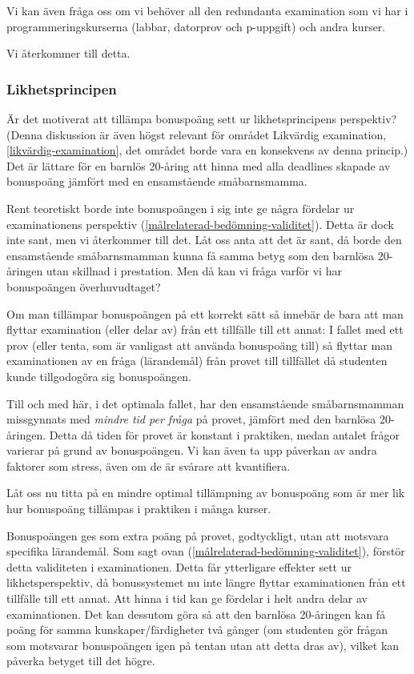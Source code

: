 Vi kan även fråga oss om vi behöver all den redundanta examination som
vi har i programmeringskurserna (labbar, datorprov och p-uppgift) och
andra kurser.

Vi återkommer till detta.

\subsubsection{Likhetsprincipen}\label{likhetsprincipen}

Är det motiverat att tillämpa bonuspoäng sett ur likhetsprincipens
perspektiv? (Denna diskussion är även högst relevant för området
Likvärdig examination, \cref{likvärdig-examination}, det området borde vara en 
konsekvens av denna princip.) Det är lättare för en barnlös 20-åring att hinna 
med alla deadlines skapade av bonuspoäng jämfört med en ensamstående
småbarnsmamma.

Rent teoretiskt borde inte bonuspoängen i sig inte ge några fördelar ur
examinationens perspektiv (\cref{målrelaterad-bedömning-validitet}). Detta är 
dock inte sant, men vi återkommer
till det. Låt oss anta att det är sant, då borde den ensamstående
småbarnsmamman kunna få samma betyg som den barnlösa 20-åringen utan
skillnad i prestation. Men då kan vi fråga varför vi har bonuspoängen
överhuvudtaget?

Om man tillämpar bonuspoängen på ett korrekt sätt så innebär de bara att
man flyttar examination (eller delar av) från ett tillfälle till ett
annat: I fallet med ett prov (eller tenta, som är vanligast att använda
bonuspoäng till) så flyttar man examinationen av en fråga (lärandemål)
från provet till tillfället då studenten kunde tillgodogöra sig
bonuspoängen.

Till och med här, i det optimala fallet, har den ensamstående
småbarnsmamman missgynnats med \emph{mindre tid per fråga} på provet,
jämfört med den barnlösa 20-åringen. Detta då tiden för provet är
konstant i praktiken, medan antalet frågor varierar på grund av
bonuspoängen. Vi kan även ta upp påverkan av andra faktorer som stress,
även om de är svårare att kvantifiera.

Låt oss nu titta på en mindre optimal tillämpning av bonuspoäng som är
mer lik hur bonuspoäng tillämpas i praktiken i många kurser.

Bonuspoängen ges som extra poäng på provet, godtyckligt, utan att
motsvara specifika lärandemål. Som sagt ovan 
(\cref{målrelaterad-bedömning-validitet}), förstör detta validiteten i 
examinationen.
Detta får ytterligare effekter sett ur likhetsperspektiv, då
bonussystemet nu inte längre flyttar examinationen från ett tillfälle
till ett annat. Att hinna i tid kan ge fördelar i helt andra delar av
examinationen. Det kan dessutom göra så att den barnlösa 20-åringen kan
få poäng för samma kunskaper/färdigheter två gånger (om studenten gör
frågan som motsvarar bonuspoängen igen på tentan utan att detta dras
av), vilket kan påverka betyget till det högre.

